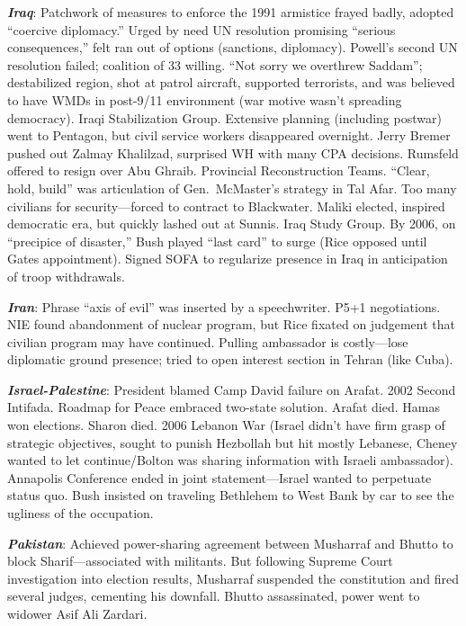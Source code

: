 \documentclass[
]{article}
\begin{document}
\textbf{\emph{Iraq}}: Patchwork of measures to enforce the 1991
armistice frayed badly, adopted ``coercive diplomacy.'' Urged by need UN
resolution promising ``serious consequences,'' felt ran out of options
(sanctions, diplomacy). Powell's second UN resolution failed; coalition
of 33 willing. ``Not sorry we overthrew Saddam''; destabilized region,
shot at patrol aircraft, supported terrorists, and was believed to have
WMDs in post-9/11 environment (war motive wasn't spreading democracy).
Iraqi Stabilization Group. Extensive planning (including postwar) went
to Pentagon, but civil service workers disappeared overnight. Jerry
Bremer pushed out Zalmay Khalilzad, surprised WH with many CPA
decisions. Rumsfeld offered to resign over Abu Ghraib. Provincial
Reconstruction Teams. ``Clear, hold, build'' was articulation of
Gen.~McMaster's strategy in Tal Afar. Too many civilians for
security---forced to contract to Blackwater. Maliki elected, inspired
democratic era, but quickly lashed out at Sunnis. Iraq Study Group. By
2006, on ``precipice of disaster,'' Bush played ``last card'' to surge
(Rice opposed until Gates appointment). Signed SOFA to regularize
presence in Iraq in anticipation of troop withdrawals.

\textbf{\emph{Iran}}: Phrase ``axis of evil'' was inserted by a
speechwriter. P5+1 negotiations. NIE found abandonment of nuclear
program, but Rice fixated on judgement that civilian program may have
continued. Pulling ambassador is costly---lose diplomatic ground
presence; tried to open interest section in Tehran (like Cuba).

\textbf{\emph{Israel-Palestine}}: President blamed Camp David failure on
Arafat. 2002 Second Intifada. Roadmap for Peace embraced two-state
solution. Arafat died. Hamas won elections. Sharon died. 2006 Lebanon
War (Israel didn't have firm grasp of strategic objectives, sought to
punish Hezbollah but hit mostly Lebanese, Cheney wanted to let
continue/Bolton was sharing information with Israeli ambassador).
Annapolis Conference ended in joint statement---Israel wanted to
perpetuate status quo. Bush insisted on traveling Bethlehem to West Bank
by car to see the ugliness of the occupation.

\textbf{\emph{Pakistan}}: Achieved power-sharing agreement between
Musharraf and Bhutto to block Sharif---associated with militants. But
following Supreme Court investigation into election results, Musharraf
suspended the constitution and fired several judges, cementing his
downfall. Bhutto assassinated, power went to widower Asif Ali Zardari.
\end{document}
